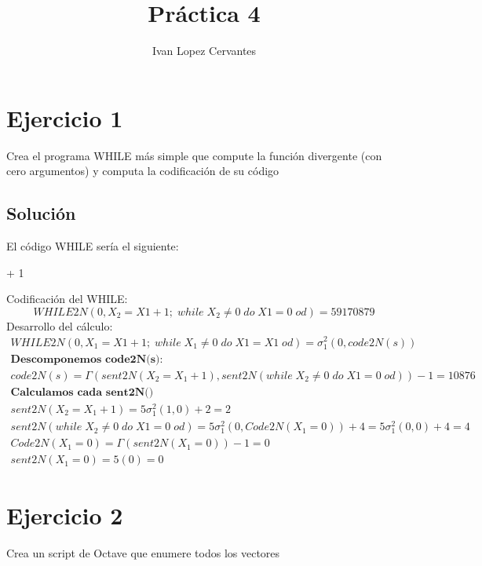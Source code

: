 \documentclass{article}
\author{Ivan Lopez Cervantes }
\date{}
\begin{document}
\title{Práctica 4}
\maketitle

\section*{Ejercicio 1}
Crea el programa WHILE más simple que compute la función divergente (con cero argumentos) y computa la codificación de su código
\subsection*{Solución}
El código WHILE sería el siguiente:\\

\begin{whilecode}[H]
\Assig{} + 1\\
\end{whilecode}
Codificación del WHILE:\\
\[
WHILE2N(0, X_2 = X1 + 1;\; while\; X_2 \neq 0\; do\; X1 = 0\;od) = \boxed{59170879}
\]
Desarrollo del cálculo: \\
\begin{gather*}
WHILE2N(0, X_1 = X1 + 1;\; while\; X_1 \neq 0\; do\; X1 = X1\;od) = \sigma^2_1(0, code2N(s))\\
\textbf{Descomponemos code2N(s):}\\
code2N(s) = \Gamma(sent2N(X_2 = X_1 + 1),sent2N( while\; X_2 \neq 0\; do\; X1 = 0\; od)) - 1 = 10876\\
\textbf{Calculamos cada sent2N()}\\
sent2N(X_2 = X_1 + 1) = 5\sigma^2_1(1,0) + 2 = 2\\
sent2N( while\; X_2 \neq 0\; do\; X1 = 0\; od) = 5\sigma^2_1(0,Code2N(X_1 = 0)) + 4 = 5\sigma^2_1(0, 0) + 4 = 4 \\
Code2N(X_1 = 0) = \Gamma(sent2N(X_1=0)) - 1 = 0 \\
sent2N(X_1=0) = 5(0) = 0
\end{gather*}

\section*{Ejercicio 2}
Crea un script de Octave que enumere todos los vectores
\end{document}
